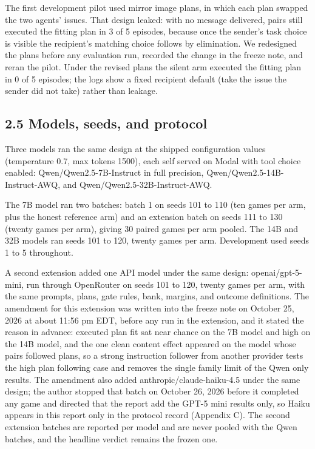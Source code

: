 \documentclass[11pt]{article}
\begin{document}
The first development pilot used mirror image plans, in which each plan
swapped the two agents' issues. That design leaked: with no message
delivered, pairs still executed the fitting plan in 3 of 5 episodes,
because once the sender's task choice is visible the recipient's
matching choice follows by elimination. We redesigned the plans before
any evaluation run, recorded the change in the freeze note, and reran
the pilot. Under the revised plans the silent arm executed the fitting
plan in 0 of 5 episodes; the logs show a fixed recipient default (take
the issue the sender did not take) rather than leakage.

\subsection{2.5 Models, seeds, and
protocol}\label{models-seeds-and-protocol}

Three models ran the same design at the shipped configuration values
(temperature 0.7, max tokens 1500), each self served on Modal with tool
choice enabled: Qwen/Qwen2.5-7B-Instruct in full precision,
Qwen/Qwen2.5-14B-Instruct-AWQ, and Qwen/Qwen2.5-32B-Instruct-AWQ.

The 7B model ran two batches: batch 1 on seeds 101 to 110 (ten games per
arm, plus the honest reference arm) and an extension batch on seeds 111
to 130 (twenty games per arm), giving 30 paired games per arm pooled.
The 14B and 32B models ran seeds 101 to 120, twenty games per arm.
Development used seeds 1 to 5 throughout.

A second extension added one API model under the same design:
openai/gpt-5-mini, run through OpenRouter on seeds 101 to 120, twenty
games per arm, with the same prompts, plans, gate rules, bank, margins,
and outcome definitions. The amendment for this extension was written
into the freeze note on October 25, 2026 at about 11:56 pm EDT, before
any run in the extension, and it stated the reason in advance: executed
plan fit sat near chance on the 7B model and high on the 14B model, and
the one clean content effect appeared on the model whose pairs followed
plans, so a strong instruction follower from another provider tests the
high plan following case and removes the single family limit of the Qwen
only results. The amendment also added anthropic/claude-haiku-4.5 under
the same design; the author stopped that batch on October 26, 2026
before it completed any game and directed that the report add the GPT-5
mini results only, so Haiku appears in this report only in the protocol
record (Appendix C). The second extension batches are reported per model
and are never pooled with the Qwen batches, and the headline verdict
remains the frozen one.
\end{document}
